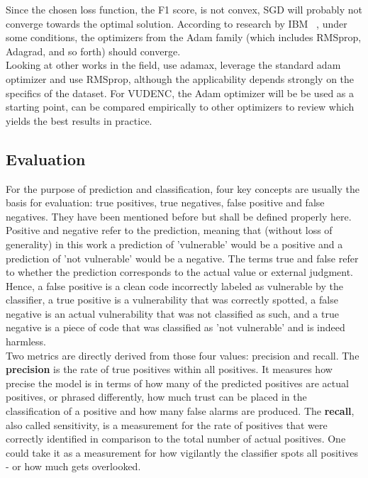 \documentclass[
	a4paper,
	pagesize,
	pdftex,
	12pt,
	twoside, %
	BCOR=5mm, %
	ngerman,
	fleqn,
	final,
	]{scrartcl}
\begin{document}
Since the chosen loss function, the F1 score, is not convex, SGD will probably not converge towards the optimal solution. According to research by IBM ~\cite{IBMResearchEditorialStaff.6.5.2019}, under some conditions, the optimizers from the Adam family (which includes RMSprop, Adagrad, and so forth) should converge.\\
Looking at other works in the field, \cite{Li.2018} use adamax, \cite{Russell.2018} leverage the standard adam optimizer and \cite{Dam.2017} use RMSprop, although the applicability depends strongly on the specifics of the dataset. For VUDENC, the Adam optimizer will be be used as a starting point, can be compared empirically to other optimizers to review which yields the best results in practice.

\subsection{Evaluation}\label{Evaluation}
For the purpose of prediction and classification, four key concepts are usually the basis for evaluation: true positives, true negatives, false positive and false negatives. They have been mentioned before but shall be defined properly here. Positive and negative refer to the prediction, meaning that (without loss of generality) in this work a prediction of 'vulnerable' would be a positive and a prediction of 'not vulnerable' would be a negative. The terms true and false refer to whether the prediction corresponds to the actual value or external judgment. Hence, a false positive is a clean code incorrectly labeled as vulnerable by the classifier, a true positive is a vulnerability that was correctly spotted, a false negative is an actual vulnerability that was not classified as such, and a true negative is a piece of code that was classified as 'not vulnerable' and is indeed harmless.\\
Two metrics are directly derived from those four values: precision and recall. The \textbf{precision} is the rate of true positives within all positives. It measures how precise the model is in terms of how many of the predicted positives are actual positives, or phrased differently, how much trust can be placed in the classification of a positive and how many false alarms are produced. The \textbf{recall}, also called sensitivity, is a measurement for the rate of positives that were correctly identified in comparison to the total number of actual positives. One could take it as a measurement for how vigilantly the classifier spots all positives - or how much gets overlooked.\newline
\end{document}
